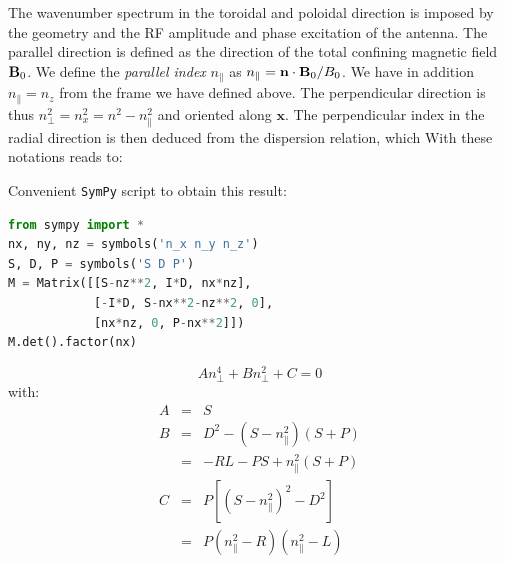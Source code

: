 The wavenumber spectrum in the toroidal and poloidal direction is imposed by the geometry and the RF amplitude and phase excitation of the antenna. The parallel direction is defined as the direction of the total confining magnetic field ${\mathbf B}_0$. We define the \textit{parallel index} $n_\parallel$ as $n_\parallel = \mathbf{n}\cdot{\mathbf B}_0/B_0$. We have in addition $n_{\parallel}=n_{z}$ from the frame we have defined above. The perpendicular direction is thus $n_{\perp}^{2}=n_{x}^{2}=n^{2}-n_{\parallel}^{2}$ and oriented along $\mathbf{x}$. The perpendicular index in the radial direction is then deduced from the dispersion relation, which With these notations reads to:
\begin{marginlisting}
Convenient \texttt{SymPy} script to obtain this result:
\begin{lstlisting}[language=Python, basicstyle=\tiny]
from sympy import *
nx, ny, nz = symbols('n_x n_y n_z')
S, D, P = symbols('S D P')
M = Matrix([[S-nz**2, I*D, nx*nz], 
			[-I*D, S-nx**2-nz**2, 0], 
			[nx*nz, 0, P-nx**2]])
M.det().factor(nx)
\end{lstlisting}
\end{marginlisting}

\begin{equation}
A n_{\perp}^{4} + B n_{\perp}^{2} + C = 0
\label{eq:cold_plasma_dispersion_relation_n_perp}
\end{equation}
with:
\begin{subequations}
	\begin{eqnarray}
		A & = & S\\
		B & = & D^2 - (S - n_\parallel^2)(S + P)\\
		  & = & -RL - PS + n_{\parallel}^{2}(S+P) \nonumber \\
		C & = & P[(S - n_{\parallel}^{2})^{2} - D^2] \\
		  & = & P(n_\parallel^2 - R)(n_\parallel^2 - L) \nonumber
		\end{eqnarray}
		\label{eq:cold_plasma_dispersion_relation_n_perp_ABC}
\end{subequations}

